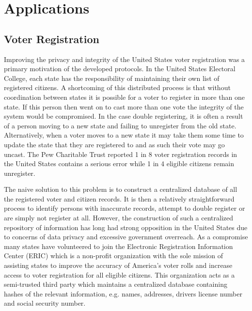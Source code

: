 \section{Applications}
\subsection{Voter Registration}

Improving the privacy and integrity of the United States voter registration was a primary motivation of the developed protocols. In  the United States Electoral College, each state has the responsibility of maintaining their own list of registered citizens. A shortcoming of this distributed process is that without coordination between states it is possible for a voter to register in more than one state. If this person then went on to cast more than one vote the integrity of the system would be compromised. In the case double registering, it is often a result of a person moving to a new state and failing to unregister from the old state. Alternatively, when a voter moves to a new state it may take them some time to update the state that they are registered to and as such their vote may go uncast. The Pew Charitable Trust\cite{pew} reported 1 in 8 voter registration records in the United States contains a serious error while 1 in 4 eligible citizens remain unregister. 

The naive solution to this problem is to construct a centralized database of all the registered voter and citizen records. It is then a relatively straightforward process to identify persons with inaccurate records, attempt to double register or are simply not register at all. However, the construction of such a centralized repository of information has long had strong opposition in the United States due to concerns of data privacy and  excessive government overreach. As a compromise many states have volunteered to join the Electronic Registration Information Center (ERIC)\cite{eric} which is a non-profit organization with the sole mission of assisting states to improve the accuracy of America’s voter rolls and increase access to voter registration for all eligible citizens. This organization acts as a semi-trusted third party which maintains a centralized database containing hashes of the relevant information, e.g. names, addresses, drivers license number and social security number. 

